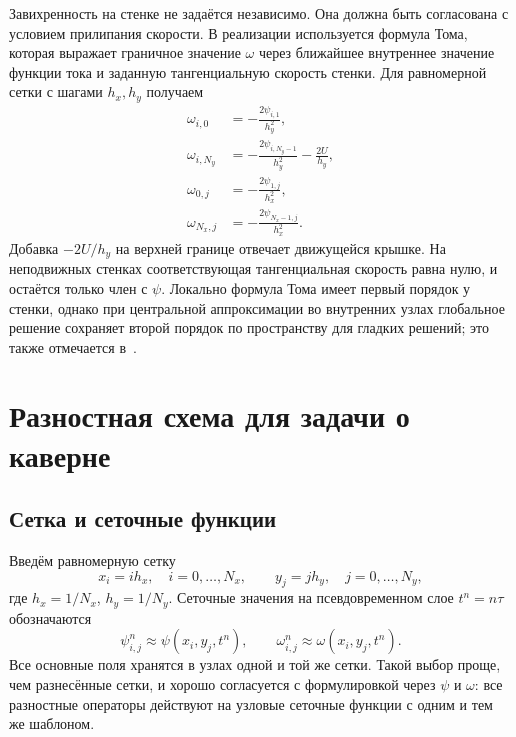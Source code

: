 \documentclass[12pt,a4paper]{article}
\begin{document}
Завихренность на стенке не задаётся независимо.
Она должна быть согласована с условием прилипания скорости.
В реализации используется формула Тома, которая выражает граничное значение \(\omega\) через ближайшее внутреннее значение функции тока и заданную тангенциальную скорость стенки.
Для равномерной сетки с шагами \(h_x,h_y\) получаем
\begin{equation}
\begin{aligned}
    \omega_{i,0}
    &=-\frac{2\psi_{i,1}}{h_y^2},\\
    \omega_{i,N_y}
    &=-\frac{2\psi_{i,N_y-1}}{h_y^2}-\frac{2U}{h_y},\\
    \omega_{0,j}
    &=-\frac{2\psi_{1,j}}{h_x^2},\\
    \omega_{N_x,j}
    &=-\frac{2\psi_{N_x-1,j}}{h_x^2}.
\end{aligned}
\label{eq:thom-cavity}
\end{equation}
Добавка \(-2U/h_y\) на верхней границе отвечает движущейся крышке.
На неподвижных стенках соответствующая тангенциальная скорость равна нулю, и остаётся только член с \(\psi\).
Локально формула Тома имеет первый порядок у стенки, однако при центральной аппроксимации во внутренних узлах глобальное решение сохраняет второй порядок по пространству для гладких решений; это также отмечается в~\cite{erturk2005}.

\section{Разностная схема для задачи о каверне}

\subsection{Сетка и сеточные функции}

Введём равномерную сетку
\begin{equation}
    x_i=ih_x,\quad i=0,\ldots,N_x,
    \qquad
    y_j=jh_y,\quad j=0,\ldots,N_y,
    \label{eq:grid}
\end{equation}
где \(h_x=1/N_x\), \(h_y=1/N_y\).
Сеточные значения на псевдовременном слое \(t^n=n\tau\) обозначаются
\[
    \psi_{i,j}^n\approx\psi(x_i,y_j,t^n),
    \qquad
    \omega_{i,j}^n\approx\omega(x_i,y_j,t^n).
\]
Все основные поля хранятся в узлах одной и той же сетки.
Такой выбор проще, чем разнесённые сетки, и хорошо согласуется с формулировкой через \(\psi\) и \(\omega\): все разностные операторы действуют на узловые сеточные функции с одним и тем же шаблоном.
\end{document}
